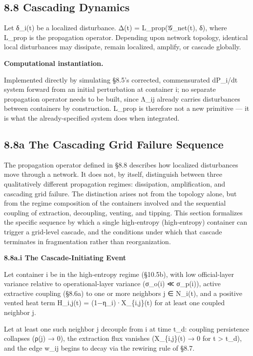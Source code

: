 \documentclass[
]{article}
\begin{document}
\hypertarget{cascading-dynamics}{%
\subsection{8.8 Cascading Dynamics}\label{cascading-dynamics}}

Let δ\_i(t) be a localized disturbance. Δ(t) = L\_prop(𝒢\_net(t), δ),
where L\_prop is the propagation operator. Depending upon network
topology, identical local disturbances may dissipate, remain localized,
amplify, or cascade globally.

\textbf{Computational instantiation.}

Implemented directly by simulating §8.5's corrected, commensurated
dP\_i/dt system forward from an initial perturbation at container i; no
separate propagation operator needs to be built, since Λ\_ij already
carries disturbances between containers by construction. L\_prop is
therefore not a new primitive --- it is what the already-specified
system does when integrated.

\hypertarget{a-the-cascading-grid-failure-sequence}{%
\subsection{8.8a The Cascading Grid Failure
Sequence}\label{a-the-cascading-grid-failure-sequence}}

The propagation operator defined in §8.8 describes how localized
disturbances move through a network. It does not, by itself, distinguish
between three qualitatively different propagation regimes: dissipation,
amplification, and cascading grid failure. The distinction arises not
from the topology alone, but from the regime composition of the
containers involved and the sequential coupling of extraction,
decoupling, venting, and tipping. This section formalizes the specific
sequence by which a single high-entropy (high-entropy) container can
trigger a grid-level cascade, and the conditions under which that
cascade terminates in fragmentation rather than reorganization.

\textbf{8.8a.i The Cascade-Initiating Event}

Let container i be in the high-entropy regime (§10.5b), with low
official-layer variance relative to operational-layer variance (σ\_o(i)
≪ σ\_p(i)), active extractive coupling (§8.6a) to one or more neighbors
j ∈ N\_i(t), and a positive vented heat term H\_i,j(t) =
(1−η\_i)·X\_\{i,j\}(t) for at least one coupled neighbor j.

Let at least one such neighbor j decouple from i at time t\_d: coupling
persistence collapses (ρ(j) → 0), the extraction flux vanishes
(X\_\{i,j\}(t) → 0 for t \textgreater{} t\_d), and the edge w\_ij begins
to decay via the rewiring rule of §8.7.
\end{document}
